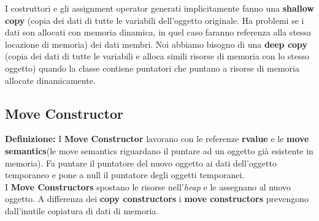 \textsf{\small I costruttori e gli assignment operator generati implicitamente fanno una \textbf{shallow copy} (copia dei dati di tutte le variabili dell'oggetto originale. Ha problemi se i dati son allocati con memoria dinamica, in quel caso faranno referenza alla stessa locazione di memoria) dei dati membri. Noi abbiamo bisogno di una \textbf{deep copy} (copia dei dati di tutte le variabili e alloca simili risorse di memoria con lo stesso oggetto) quando la classe contiene puntatori che puntano a risorse di memoria allocate dinamicamente.} \\

\subsection{Move Constructor}

\textsf{\small \textbf{Definizione: } I \textbf{Move Constructor} lavorano con le referenze \textbf{rvalue} e le \textbf{move semantics}(le move semantics riguardano il puntare ad un oggetto già esistente in memoria). Fa puntare il puntatore del nuovo oggetto ai dati dell'oggetto temporaneo e pone a null il puntatore degli oggetti temporanei.} \\

\textsf{\small I \textbf{Move Constructors} spostano le risorse nell'\emph{heap} e le assegnano al nuovo oggetto. A differenza dei \textbf{copy constructors} i \textbf{move constructors} prevengono dall'inutile copiatura di dati di memoria.} \\

